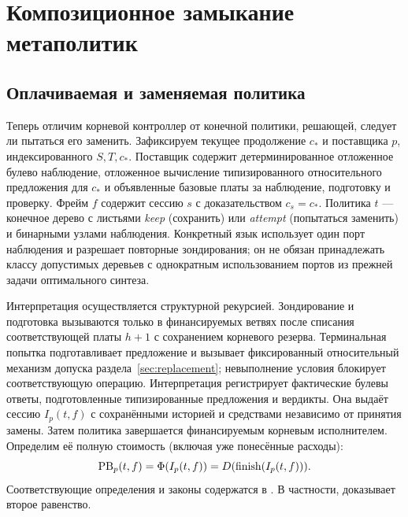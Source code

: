 \section{Композиционное замыкание метаполитик}\label{sec:closure}
\subsection{Оплачиваемая и заменяемая политика}
Теперь отличим корневой контроллер от конечной политики, решающей, следует ли пытаться его заменить. Зафиксируем текущее продолжение $c_*$ и поставщика $p$, индексированного $S,T,c_*$. Поставщик содержит детерминированное отложенное булево наблюдение, отложенное вычисление типизированного относительного предложения для $c_*$ и объявленные базовые платы за наблюдение, подготовку и проверку. Фрейм $f$ содержит сессию $s$ с доказательством $c_s=c_*$. Политика $t$ --- конечное дерево с листьями \emph{keep} (сохранить) или \emph{attempt} (попытаться заменить) и бинарными узлами наблюдения. Конкретный язык использует один порт наблюдения и разрешает повторные зондирования; он не обязан принадлежать классу допустимых деревьев с однократным использованием портов из прежней задачи оптимального синтеза.

Интерпретация осуществляется структурной рекурсией. Зондирование и подготовка вызываются только в финансируемых ветвях после списания соответствующей платы $h+1$ с сохранением корневого резерва. Терминальная попытка подготавливает предложение и вызывает фиксированный относительный механизм допуска раздела~\ref{sec:replacement}; невыполнение условия блокирует соответствующую операцию. Интерпретация регистрирует фактические булевы ответы, подготовленные типизированные предложения и вердикты. Она выдаёт сессию $I_p(t,f)$ с сохранёнными историей и средствами независимо от принятия замены. Затем политика завершается финансируемым корневым исполнителем. Определим её полную стоимость (включая уже понесённые расходы):
\begin{equation}\label{eq:policy-bill}
 \operatorname{PB}_p(t,f)=\Phi(I_p(t,f))=D(\operatorname{finish}(I_p(t,f))).
\end{equation}
Соответствующие определения и законы содержатся в . В частности,  доказывает второе равенство.

